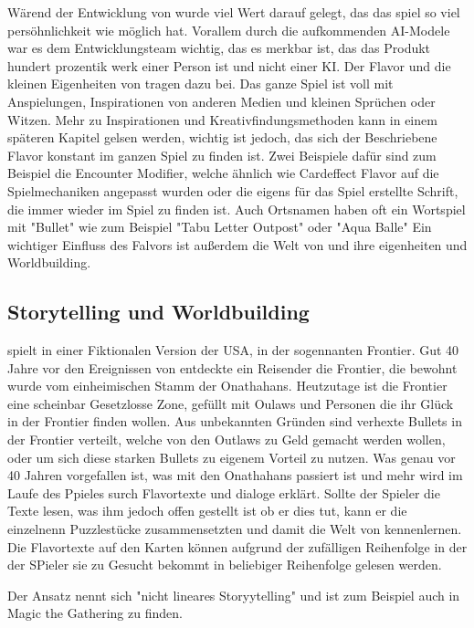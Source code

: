 Wärend der Entwicklung von \FF wurde viel Wert darauf gelegt, das das spiel so viel persöhnlichkeit wie möglich hat.
Vorallem durch die aufkommenden AI-Modele war es dem Entwicklungsteam wichtig, das es merkbar ist,
das das Produkt hundert prozentik werk einer Person ist und nicht einer KI.
Der Flavor und die kleinen Eigenheiten von \FF tragen dazu bei.
Das ganze Spiel ist voll mit Anspielungen, Inspirationen von anderen Medien und kleinen Sprüchen oder Witzen. Mehr zu Inspirationen und Kreativfindungsmethoden
kann in einem späteren Kapitel gelsen werden, wichtig ist jedoch, das sich der Beschriebene Flavor konstant im ganzen Spiel zu finden ist.
Zwei Beispiele dafür sind zum Beispiel die Encounter Modifier, welche ähnlich wie Cardeffect Flavor auf die Spielmechaniken
angepasst wurden oder die eigens für das Spiel erstellte Schrift, die immer wieder im Spiel zu finden ist. Auch Ortsnamen
haben oft ein Wortspiel mit "Bullet" wie zum Beispiel "Tabu Letter Outpost" oder "Aqua Balle"
Ein wichtiger Einfluss des Falvors ist außerdem die Welt von \FF und ihre eigenheiten und Worldbuilding.



\subsection{Storytelling und Worldbuilding}\label{subsec:storytellingUndWorldbuilding}

\FF spielt in einer Fiktionalen Version der USA, in der sogennanten Frontier. Gut 40 Jahre vor den Ereignissen von \FF entdeckte
ein Reisender die Frontier, die bewohnt wurde vom einheimischen Stamm der Onathahans. Heutzutage ist die Frontier eine
scheinbar Gesetzlosse Zone, gefüllt mit Oulaws und Personen die ihr Glück in der Frontier finden wollen. Aus unbekannten
Gründen sind verhexte Bullets in der Frontier verteilt, welche von den Outlaws zu Geld gemacht werden wollen,
oder um sich diese starken Bullets zu eigenem Vorteil zu nutzen. Was genau vor 40 Jahren vorgefallen ist,
was mit den Onathahans passiert ist und mehr wird im Laufe des Ppieles surch Flavortexte und dialoge erklärt.
Sollte der Spieler die Texte lesen, was ihm jedoch offen gestellt ist ob er dies tut, kann er die einzelnenn Puzzlestücke
zusammensetzten und damit die Welt von \FF kennenlernen. Die Flavortexte auf den Karten können aufgrund der
zufälligen Reihenfolge in der der SPieler sie zu Gesucht bekommt in beliebiger Reihenfolge gelesen werden. 


Der Ansatz nennt sich "nicht lineares Storyytelling" und ist zum Beispiel auch in Magic the Gathering zu finden.\cite{nonlinearstorytelling}


